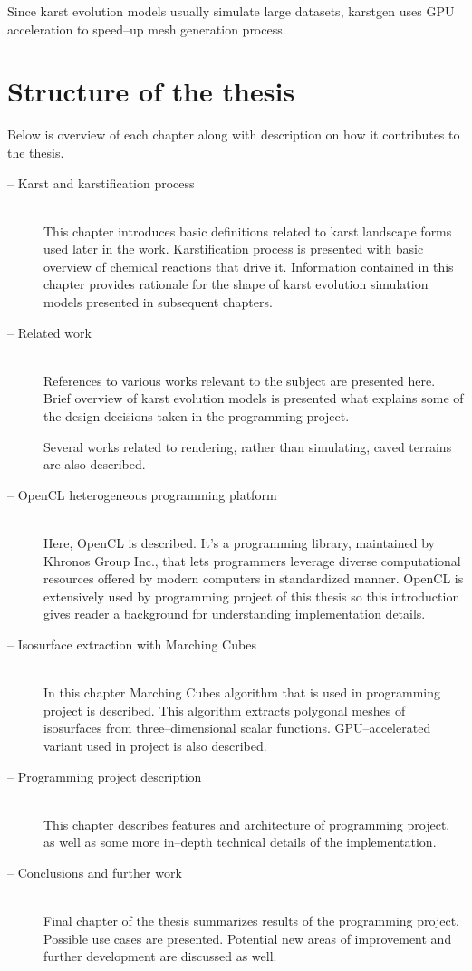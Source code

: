 Since karst evolution models usually simulate large datasets, karstgen uses
GPU acceleration to speed--up mesh generation process.

\pagebreak
\section{Structure of the thesis}

Below is overview of each chapter along with description on how it contributes to
the thesis.
\begin{description}
  \item[ -- Karst and karstification process] \hfill \\
    This chapter introduces basic definitions related to karst landscape forms
    used later in the work. Karstification process is presented with basic
    overview of chemical reactions that drive it. Information contained in this
    chapter provides rationale for the shape of karst evolution simulation
    models presented in subsequent chapters.
  \item[ -- Related work] \hfill \\
    References to various works relevant to the subject are presented here.
    Brief overview of karst evolution models is presented what explains some
    of the design decisions taken in the programming project.

    Several works related to rendering, rather than simulating, caved terrains
    are also described.
  \item[ -- OpenCL heterogeneous programming platform] \hfill \\
    Here, OpenCL is described. It's a programming library, maintained by Khronos
    Group Inc., that lets programmers leverage diverse computational resources
    offered by modern computers in standardized manner. OpenCL is extensively
    used by programming project of this thesis so this introduction gives
    reader a background for understanding implementation details.
  \item[ -- Isosurface extraction with Marching Cubes] \hfill \\
    In this chapter Marching Cubes algorithm that is used in programming project
    is described. This algorithm extracts polygonal meshes of isosurfaces from
    three--dimensional scalar functions. GPU--accelerated variant used in
    project is also described.
  \item[ -- Programming project description] \hfill \\
    This chapter describes features and architecture of programming project, as
    well as some more in--depth technical details of the implementation.
  \item[ -- Conclusions and further work] \hfill \\
    Final chapter of the thesis summarizes results of the programming project.
    Possible use cases are presented. Potential new areas of improvement and
    further development are discussed as well.
\end{description}

